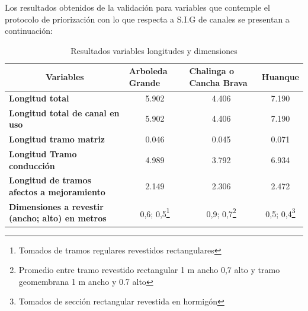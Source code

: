 \documentclass[]{article}
\let\rmarkdownfootnote\footnote%
\def\footnote{\protect\rmarkdownfootnote}
\begin{document}
Los resultados obtenidos de la validación para variables que contemple el protocolo de priorización con lo que respecta a S.I.G de canales se presentan a continuación: 

\begin{longtable}{|l|ccc|}
\caption{Resultados variables longitudes y dimensiones}\\
\hline
\multicolumn{1}{|c|}{\textbf{Variables}}                 & \multicolumn{1}{l}{\textbf{Arboleda Grande}} & \multicolumn{1}{l}{\textbf{Chalinga o Cancha Brava}} & \multicolumn{1}{l|}{\textbf{Huanque}} \\ \hline
\textbf{Longitud total}                                  & 5.902                                        & 4.406                                                & 7.190                                 \\
\textbf{Longitud total de canal en uso}                  & 5.902                                        & 4.406                                                & 7.190                                 \\
\textbf{Longitud tramo matriz}                           & 0.046                                        & 0.045                                                & 0.071                                 \\
\textbf{Longitud Tramo conducción}                       & 4.989                                        & 3.792                                                & 6.934                                 \\
\textbf{Longitud de tramos afectos a mejoramiento}       & 2.149                                        & 2.306                                                & 2.472                                 \\
\textbf{Dimensiones a revestir  (ancho; alto) en metros} & 0,6; 0,5\footnote{Tomados de tramos regulares revestidos rectangulares}                                    & 0,9; 0,7\footnote{Promedio entre tramo revestido rectangular 1 m ancho 0,7 alto y tramo geomembrana 1 m ancho y 0.7 alto}                                          & 0,5; 0,4\footnote{Tomados de sección rectangular revestida en hormigón }                           \\ 
\hline
\end{longtable}%
\end{document}
